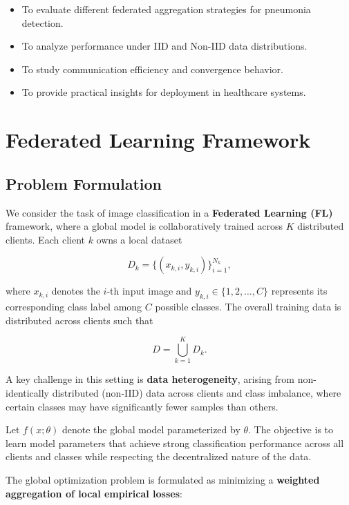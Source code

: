 \documentclass[12pt]{book}
\begin{document}
\begin{itemize}
\item To evaluate different federated aggregation strategies for pneumonia detection.
\item To analyze performance under IID and Non-IID data distributions.
\item To study communication efficiency and convergence behavior.
\item To provide practical insights for deployment in healthcare systems.
\end{itemize}

\chapter{Federated Learning Framework}

\section{Problem Formulation}


We consider the task of image classification in a \textbf{Federated Learning (FL)} framework, where a global model is collaboratively trained across $K$ distributed clients. Each client $k$ owns a local dataset

\begin{equation}
D_k = \{(x_{k,i}, y_{k,i})\}_{i=1}^{N_k},
\end{equation}

where $x_{k,i}$ denotes the $i$-th input image and $y_{k,i} \in \{1,2,\ldots,C\}$ represents its corresponding class label among $C$ possible classes. The overall training data is distributed across clients such that

\begin{equation}
D = \bigcup_{k=1}^{K} D_k .
\end{equation}

A key challenge in this setting is \textbf{data heterogeneity}, arising from non-identically distributed (non-IID) data across clients and class imbalance, where certain classes may have significantly fewer samples than others.

Let $f(x;\theta)$ denote the global model parameterized by $\theta$. The objective is to learn model parameters that achieve strong classification performance across all clients and classes while respecting the decentralized nature of the data.

The global optimization problem is formulated as minimizing a \textbf{weighted aggregation of local empirical losses}:
\end{document}
